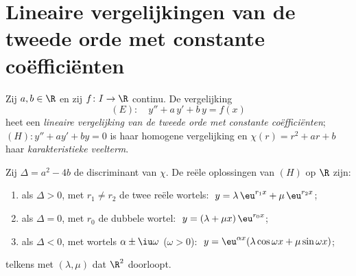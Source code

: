 \section{Lineaire vergelijkingen van de tweede orde met constante coëfficiënten}

\begin{definition}\label{def:b1:diffeq:linear2}
Zij $a, b \in \R$ en zij $f \colon I \to \R$ continu. De vergelijking
\[
(E)\colon\quad y'' + a\,y' + b\,y = f(x)
\]
heet een \emph{lineaire vergelijking van de tweede orde met constante
coëfficiënten}; $(H)\colon y'' + ay' + by = 0$ is haar homogene vergelijking en
$\chi(r) = r^2 + ar + b$ haar \emph{karakteristieke
veelterm}.
\end{definition}

\begin{theorem}\label{thm:b1:diffeq:homogeneous2}
Zij $\Delta = a^2 - 4b$ de discriminant van $\chi$. De reële oplossingen
van $(H)$ op $\R$ zijn:
\begin{enumerate}
  \item als $\Delta > 0$, met $r_1 \neq r_2$ de twee reële wortels:
        $\;y = \lambda\, \eu^{r_1 x} + \mu\, \eu^{r_2 x}$;
  \item als $\Delta = 0$, met $r_0$ de dubbele wortel:
        $\;y = (\lambda + \mu x)\, \eu^{r_0 x}$;
  \item als $\Delta < 0$, met wortels $\alpha \pm \iu\omega$
        ($\omega > 0$):
        $\;y = \eu^{\alpha x} (\lambda \cos\omega x + \mu
        \sin\omega x)$;
\end{enumerate}
telkens met $(\lambda, \mu)$ dat $\R^2$ doorloopt.
\end{theorem}

